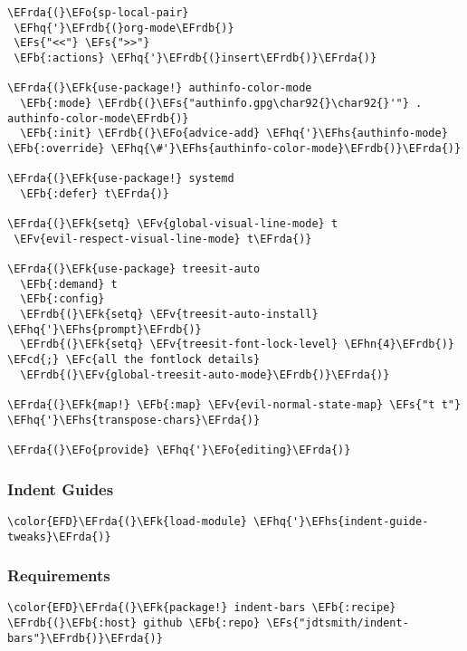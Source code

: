 \documentclass[a4wide,10pt]{article}
\newcommand{\EFc}[1]{\textcolor{EFc}{#1}} %
\newcommand{\EFcd}[1]{\textcolor{EFcd}{#1}} %
\newcommand{\EFs}[1]{\textcolor{EFs}{#1}} %
\newcommand{\EFk}[1]{\textcolor{EFk}{#1}} %
\newcommand{\EFb}[1]{\textcolor{EFb}{#1}} %
\newcommand{\EFv}[1]{\textcolor{EFv}{#1}} %
\newcommand{\EFo}[1]{\textcolor{EFo}{#1}} %
\newcommand{\EFhn}[1]{\textcolor{EFhn}{\textbf{#1}}} %
\newcommand{\EFhq}[1]{\textcolor{EFhq}{#1}} %
\newcommand{\EFhs}[1]{\textcolor{EFhs}{#1}} %
\newcommand{\EFrda}[1]{\textcolor{EFrda}{#1}} %
\newcommand{\EFrdb}[1]{\textcolor{EFrdb}{#1}} %
\begin{document}
\begin{Code}
\begin{Verbatim}
\EFrda{(}\EFo{sp-local-pair}
 \EFhq{'}\EFrdb{(}org-mode\EFrdb{)}
 \EFs{"<<"} \EFs{">>"}
 \EFb{:actions} \EFhq{'}\EFrdb{(}insert\EFrdb{)}\EFrda{)}

\EFrda{(}\EFk{use-package!} authinfo-color-mode
  \EFb{:mode} \EFrdb{(}\EFs{"authinfo.gpg\char92{}\char92{}'"} . authinfo-color-mode\EFrdb{)}
  \EFb{:init} \EFrdb{(}\EFo{advice-add} \EFhq{'}\EFhs{authinfo-mode} \EFb{:override} \EFhq{\#'}\EFhs{authinfo-color-mode}\EFrdb{)}\EFrda{)}

\EFrda{(}\EFk{use-package!} systemd
  \EFb{:defer} t\EFrda{)}

\EFrda{(}\EFk{setq} \EFv{global-visual-line-mode} t
 \EFv{evil-respect-visual-line-mode} t\EFrda{)}

\EFrda{(}\EFk{use-package} treesit-auto
  \EFb{:demand} t
  \EFb{:config}
  \EFrdb{(}\EFk{setq} \EFv{treesit-auto-install} \EFhq{'}\EFhs{prompt}\EFrdb{)}
  \EFrdb{(}\EFk{setq} \EFv{treesit-font-lock-level} \EFhn{4}\EFrdb{)} \EFcd{;} \EFc{all the fontlock details}
  \EFrdb{(}\EFv{global-treesit-auto-mode}\EFrdb{)}\EFrda{)}

\EFrda{(}\EFk{map!} \EFb{:map} \EFv{evil-normal-state-map} \EFs{"t t"} \EFhq{'}\EFhs{transpose-chars}\EFrda{)}

\EFrda{(}\EFo{provide} \EFhq{'}\EFo{editing}\EFrda{)}
\end{Verbatim}
\end{Code}
\subsubsection{Indent Guides}
\label{sec:orgec491ff}
\begin{Code}
\begin{Verbatim}
\color{EFD}\EFrda{(}\EFk{load-module} \EFhq{'}\EFhs{indent-guide-tweaks}\EFrda{)}
\end{Verbatim}
\end{Code}
\subsubsection{Requirements}
\label{sec:org04bffc6}
\begin{Code}
\begin{Verbatim}
\color{EFD}\EFrda{(}\EFk{package!} indent-bars \EFb{:recipe} \EFrdb{(}\EFb{:host} github \EFb{:repo} \EFs{"jdtsmith/indent-bars"}\EFrdb{)}\EFrda{)}
\end{Verbatim}
\end{Code}
\end{document}
